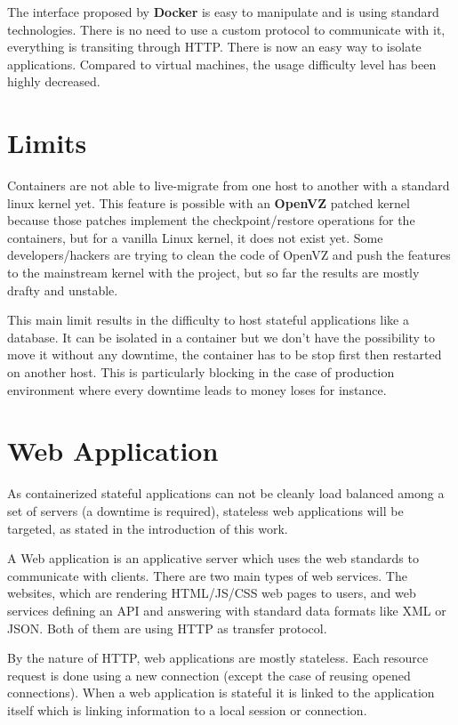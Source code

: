 The interface proposed by \textbf{Docker} is easy to manipulate and is using
standard technologies. There is no need to use a custom protocol to communicate
with it, everything is transiting through HTTP\@. There is now an easy way to
isolate applications. Compared to virtual machines, the usage difficulty level
has been highly decreased.

\section{Limits}

Containers are not able to live-migrate from one host to another with a
standard linux kernel yet. This feature is possible with an \textbf{OpenVZ}
patched kernel because those patches implement the checkpoint/restore
operations for the containers, but for a vanilla Linux kernel, it does not
exist yet. Some developers/hackers are trying to clean the code of OpenVZ and
push the features to the mainstream kernel with the \cite{websiteCRIU} project,
but so far the results are mostly drafty and unstable.

This main limit results in the difficulty to host stateful applications like a
database. It can be isolated in a container but we don't have the possibility
to move it without any downtime, the container has to be stop first then
restarted on another host. This is particularly blocking in the case of
production environment where every downtime leads to money loses for instance.

\section{Web Application}

As containerized stateful applications can not be cleanly load balanced among a
set of servers (a downtime is required), stateless web applications will be
targeted, as stated in the introduction of this work.

A Web application is an applicative server which uses the web standards to
communicate with clients. There are two main types of web services. The
websites, which are rendering HTML/JS/CSS web pages to users, and web services
defining an API and answering with standard data formats like XML or JSON\@. Both
of them are using HTTP as transfer protocol.

By the nature of HTTP, web applications are mostly stateless. Each resource
request is done using a new connection (except the case of reusing opened
connections). When a web application is stateful it is linked to the
application itself which is linking information to a local session or
connection.

